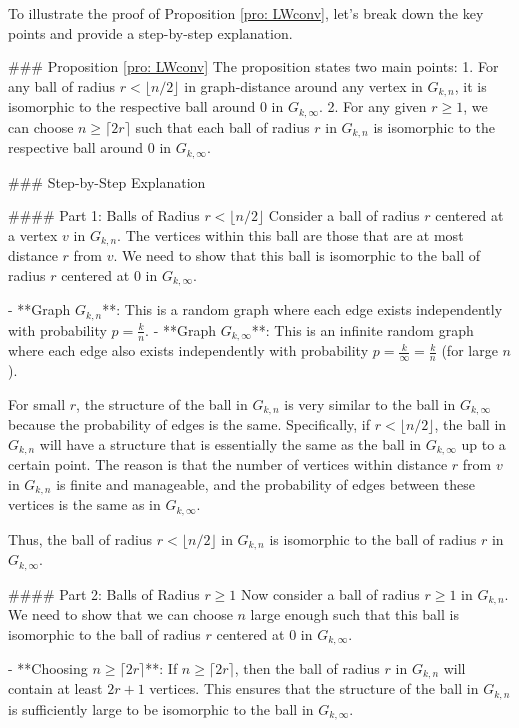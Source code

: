 To illustrate the proof of Proposition \ref{pro: LWconv}, let's break down the key points and provide a step-by-step explanation.

### Proposition \ref{pro: LWconv}
The proposition states two main points:
1. For any ball of radius \( r < \lfloor n/2 \rfloor \) in graph-distance around any vertex in \( G_{k,n} \), it is isomorphic to the respective ball around \( 0 \) in \( G_{k,\infty} \).
2. For any given \( r \geq 1 \), we can choose \( n \geq \lceil 2r \rceil \) such that each ball of radius \( r \) in \( G_{k,n} \) is isomorphic to the respective ball around \( 0 \) in \( G_{k,\infty} \).

### Step-by-Step Explanation

#### Part 1: Balls of Radius \( r < \lfloor n/2 \rfloor \)
Consider a ball of radius \( r \) centered at a vertex \( v \) in \( G_{k,n} \). The vertices within this ball are those that are at most distance \( r \) from \( v \). We need to show that this ball is isomorphic to the ball of radius \( r \) centered at \( 0 \) in \( G_{k,\infty} \).

- **Graph \( G_{k,n} \)**: This is a random graph where each edge exists independently with probability \( p = \frac{k}{n} \).
- **Graph \( G_{k,\infty} \)**: This is an infinite random graph where each edge also exists independently with probability \( p = \frac{k}{\infty} = \frac{k}{n} \) (for large \( n \)).

For small \( r \), the structure of the ball in \( G_{k,n} \) is very similar to the ball in \( G_{k,\infty} \) because the probability of edges is the same. Specifically, if \( r < \lfloor n/2 \rfloor \), the ball in \( G_{k,n} \) will have a structure that is essentially the same as the ball in \( G_{k,\infty} \) up to a certain point. The reason is that the number of vertices within distance \( r \) from \( v \) in \( G_{k,n} \) is finite and manageable, and the probability of edges between these vertices is the same as in \( G_{k,\infty} \).

Thus, the ball of radius \( r < \lfloor n/2 \rfloor \) in \( G_{k,n} \) is isomorphic to the ball of radius \( r \) in \( G_{k,\infty} \).

#### Part 2: Balls of Radius \( r \geq 1 \)
Now consider a ball of radius \( r \geq 1 \) in \( G_{k,n} \). We need to show that we can choose \( n \) large enough such that this ball is isomorphic to the ball of radius \( r \) centered at \( 0 \) in \( G_{k,\infty} \).

- **Choosing \( n \geq \lceil 2r \rceil \)**: If \( n \geq \lceil 2r \rceil \), then the ball of radius \( r \) in \( G_{k,n} \) will contain at least \( 2r + 1 \) vertices. This ensures that the structure of the ball in \( G_{k,n} \) is sufficiently large to be isomorphic to the ball in \( G_{k,\infty} \).


